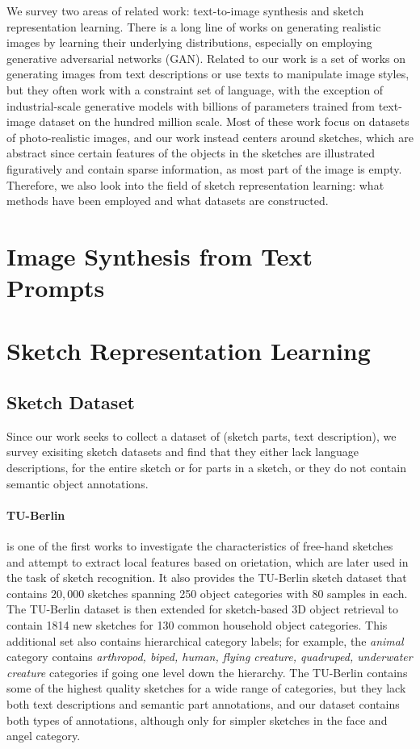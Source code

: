 
We survey two areas of related work: text-to-image synthesis and sketch representation learning. There is a long line of works on generating realistic images by learning their underlying distributions, especially on employing generative adversarial networks (GAN). 
Related to our work is a set of works on generating images from text descriptions or use texts to manipulate image styles, but they often work with a constraint set of language, with the exception of industrial-scale generative models with billions of parameters trained from text-image dataset on the hundred million scale. %
Most of these work focus on datasets of photo-realistic images, and our work instead centers around sketches, which are abstract since certain features of the objects in the sketches are illustrated figuratively and contain sparse information, as most part of the image is empty. 
Therefore, we also look into the field of sketch representation learning: what methods have been employed and what datasets are constructed.   

\section{Image Synthesis from Text Prompts}


\section{Sketch Representation Learning}

\subsection{Sketch Dataset}
Since our work seeks to collect a dataset of (sketch parts, text description), we survey exisiting sketch datasets and find that they either lack language descriptions, for the entire sketch or for parts in a sketch, or they do not contain semantic object annotations. 

\paragraph{TU-Berlin}
\citet{eitz2012hdhso} is one of the first works to investigate the characteristics of free-hand sketches and attempt to extract local features based on orietation, which are later used in the task of sketch recognition. It also provides the TU-Berlin sketch dataset that contains $20,000$ sketches spanning 250 object categories with 80 samples in each. The TU-Berlin dataset is then extended for sketch-based 3D object retrieval to contain 1814 new sketches for 130 common household object categories. This additional set also contains hierarchical category labels; for example, the \textit{animal} category contains \textit{arthropod, biped, human, flying creature, quadruped, underwater creature} categories if going one level down the hierarchy. The TU-Berlin contains some of the highest quality sketches for a wide range of categories, but they lack both text descriptions and semantic part annotations, and our dataset contains both types of annotations, although only for simpler sketches in the face and angel category.    

